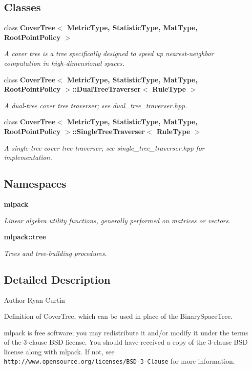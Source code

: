 \subsection*{Classes}
\begin{DoxyCompactItemize}
\item 
class \textbf{ Cover\+Tree$<$ Metric\+Type, Statistic\+Type, Mat\+Type, Root\+Point\+Policy $>$}
\begin{DoxyCompactList}\small\item\em A cover tree is a tree specifically designed to speed up nearest-\/neighbor computation in high-\/dimensional spaces. \end{DoxyCompactList}\item 
class \textbf{ Cover\+Tree$<$ Metric\+Type, Statistic\+Type, Mat\+Type, Root\+Point\+Policy $>$\+::\+Dual\+Tree\+Traverser$<$ Rule\+Type $>$}
\begin{DoxyCompactList}\small\item\em A dual-\/tree cover tree traverser; see dual\+\_\+tree\+\_\+traverser.\+hpp. \end{DoxyCompactList}\item 
class \textbf{ Cover\+Tree$<$ Metric\+Type, Statistic\+Type, Mat\+Type, Root\+Point\+Policy $>$\+::\+Single\+Tree\+Traverser$<$ Rule\+Type $>$}
\begin{DoxyCompactList}\small\item\em A single-\/tree cover tree traverser; see single\+\_\+tree\+\_\+traverser.\+hpp for implementation. \end{DoxyCompactList}\end{DoxyCompactItemize}
\subsection*{Namespaces}
\begin{DoxyCompactItemize}
\item 
 \textbf{ mlpack}
\begin{DoxyCompactList}\small\item\em Linear algebra utility functions, generally performed on matrices or vectors. \end{DoxyCompactList}\item 
 \textbf{ mlpack\+::tree}
\begin{DoxyCompactList}\small\item\em Trees and tree-\/building procedures. \end{DoxyCompactList}\end{DoxyCompactItemize}


\subsection{Detailed Description}
\begin{DoxyAuthor}{Author}
Ryan Curtin
\end{DoxyAuthor}
Definition of Cover\+Tree, which can be used in place of the Binary\+Space\+Tree.

mlpack is free software; you may redistribute it and/or modify it under the terms of the 3-\/clause B\+SD license. You should have received a copy of the 3-\/clause B\+SD license along with mlpack. If not, see {\tt http\+://www.\+opensource.\+org/licenses/\+B\+S\+D-\/3-\/\+Clause} for more information. 